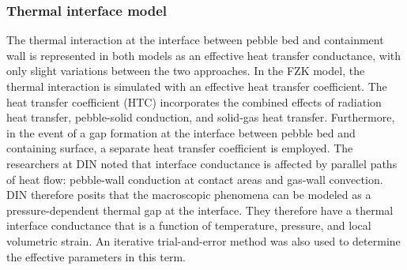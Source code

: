 \subsubsection{Thermal interface model}
The thermal interaction at the interface between pebble bed and containment wall is represented in both models as an effective heat transfer conductance, with only slight variations between the two approaches. In the FZK model, the thermal interaction is simulated with an effective heat transfer coefficient. The heat transfer coefficient (HTC) incorporates the combined effects of radiation heat transfer, pebble-solid conduction, and solid-gas heat transfer. Furthermore, in the event of a gap formation at the interface between pebble bed and containing surface, a separate heat transfer coefficient is employed. The researchers at DIN noted that interface conductance is affected by parallel paths of heat flow: pebble-wall conduction at contact areas and gas-wall convection. DIN therefore posits that the macroscopic phenomena can be modeled as a pressure-dependent thermal gap at the interface. They therefore have a thermal interface conductance that is a function of temperature, pressure, and local volumetric strain. An iterative trial-and-error method was also used to determine the effective parameters in this term. 





